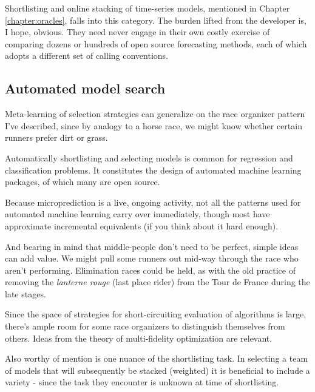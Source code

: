 Shortlisting and online stacking of time-series models, mentioned in Chapter \ref{chapter:oracles}, falls into this category. The burden lifted from the developer is, I hope, obvious. They need never engage in their own costly exercise of comparing dozens or hundreds of open source forecasting methods, each of which adopts a different set of calling conventions.  


\subsection{Automated model search}


Meta-learning of selection strategies can generalize on the race organizer pattern I've described, since by analogy to a horse race, we might know whether certain runners prefer dirt or grass. 

Automatically shortlisting and selecting models is common for regression and classification problems. It constitutes the design of automated machine learning packages, of which many are open source.


Because microprediction is a live, ongoing activity, not all the patterns used for automated machine learning carry over immediately, though most have approximate incremental equivalents (if you think about it hard enough). 

And bearing in mind that middle-people don't need to be perfect, simple ideas can add value. We might pull some runners out mid-way through the race who aren't performing. Elimination races could be held, as with the old practice of removing the {\em lanterne rouge} (last place rider) from the Tour de France during the late stages. 

Since the space of strategies for short-circuiting evaluation of algorithms is large, there's ample room for some race organizers to distinguish themselves from others. Ideas from the theory of multi-fidelity optimization are relevant. 

Also worthy of mention is one nuance of the shortlisting task. In selecting a team of models that will subsequently be stacked (weighted) it is beneficial to include a variety - since the task they encounter is unknown at time of shortlisting. 

